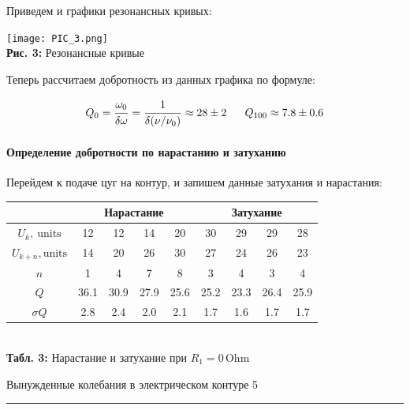 \documentclass[12pt,a4paper]{scrartcl}
\begin{document}
	Приведем и графики резонансных кривых:
	
	\begin{center}
		\texttt{[image: PIC\_3.png]}
		\\\textbf{Рис. 3:} Резонансные кривые
	\end{center}

	Теперь рассчитаем добротность из данных графика по формуле:
	
	$$Q_{0} = \dfrac{\strut \omega_0}{\strut \delta{\omega}} = \dfrac{\strut 1}{\strut \delta(\nu / \nu_0)} \approx 28 \pm 2\ \ \ \ \ Q_{100} \approx 7.8 \pm 0.6$$
	
	\paragraph{Определение добротности по нарастанию и затуханию} \hfill
	
	Перейдем к подаче цуг на контур, и запишем данные затухания и нарастания:
	
	\begin{center}
		\begin{tabular}{|c|c|c|c|c|c|c|c|c|}  \hline
			{} & \multicolumn{4}{|c|}{Нарастание} & \multicolumn{4}{|c|}{Затухание} \\\hline
			$U_k,\ \text{units}$ & 12 & 12 & 14 & 20 & 30 & 29 & 29 & 28 \\\hline
			$U_{k+n}, \text{units}$ & 14 & 20 & 26 & 30 & 27 & 24 & 26 & 23 \\\hline
			$n$ & 1 & 4 & 7 & 8 & 3 & 4 & 3 & 4 \\\hline
			$Q$ & 36.1 & 30.9 & 27.9 & 25.6 & 25.2 & 23.3 & 26.4 & 25.9 \\\hline
			$\sigma Q$ & 2.8 & 2.4 & 2.0 & 2.1 & 1.7 & 1.6 & 1.7 & 1.7 \\\hline
		\end{tabular}
		\\\textbf{Табл. 3:} Нарастание и затухание при $R_1 = 0\, \mathrm{Ohm}$
	\end{center}
	
	\newpage
	
	
	\begin{flushleft}
		\footnotesize{Вынужденные колебания в электрическом контуре} \hspace{\fill} \footnotesize{5}
		\\[-0.3cm]\noindent\rule{\textwidth}{0.3pt}
	\end{flushleft}
	
\end{document}
